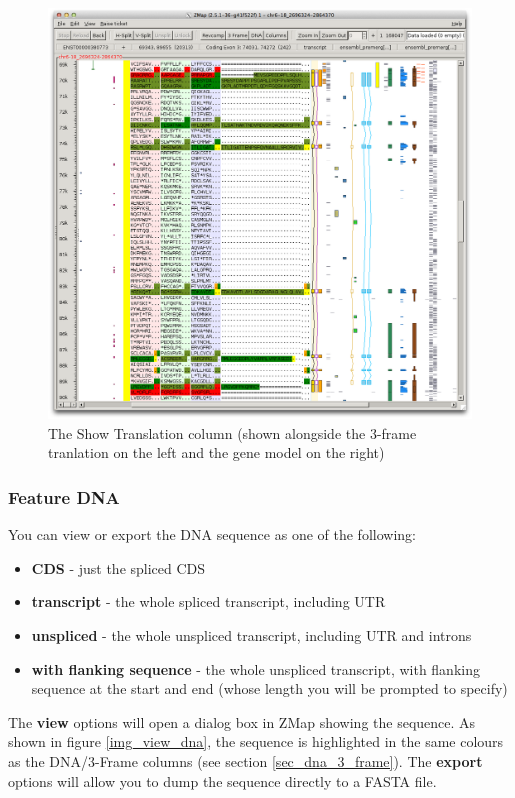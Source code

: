 \documentclass[letterpaper]{article}
\begin{document}
\begin{figure}
\centering
\color[rgb]{0.30980393,0.5058824,0.7411765}
\includegraphics[width=15.231cm]{img_show_translation.png}
\caption{The Show Translation column (shown alongside the 3-frame tranlation on the left and the gene model on the right)}
\label{img_show_translation}
\end{figure}

\subsubsection{Feature DNA}
You can view or export the DNA sequence as one of the following:

\begin{itemize}
\item \textbf{CDS} - just the spliced CDS
\item \textbf{transcript} - the whole spliced transcript, including UTR
\item \textbf{unspliced} - the whole unspliced transcript, including UTR and introns
\item \textbf{with flanking sequence} - the whole unspliced transcript, with flanking sequence at the start and end (whose length you will be prompted to specify)
\end{itemize}

The \textbf{view} options will open a dialog box in ZMap showing the sequence. As shown in figure \ref{img_view_dna}, the sequence is highlighted in the same colours as the DNA/3-Frame columns (see section \ref{sec_dna_3_frame}). The \textbf{export} options will allow you to dump the sequence directly to a FASTA file.
\end{document}
